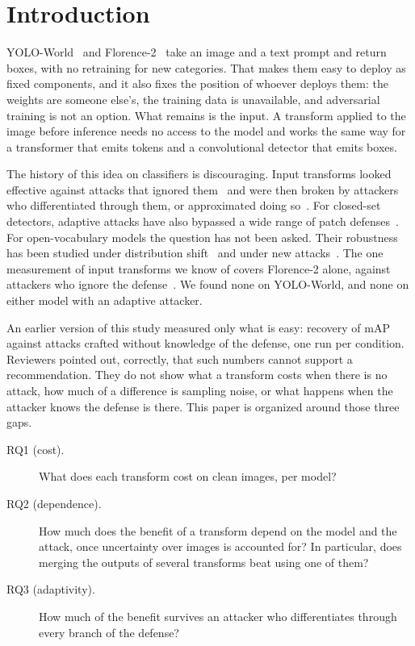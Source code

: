 \documentclass[11pt]{article}
\newcommand{\yw}{YOLO-World}
\newcommand{\fl}{Florence-2}
\begin{document}
\section{Introduction}

\yw{}~\cite{cheng2024yolo} and \fl{}~\cite{xiao2024florence} take an image
and a text prompt and return boxes, with no retraining for new categories.
That makes them easy to deploy as fixed components, and it also fixes the
position of whoever deploys them: the weights are someone else's, the training
data is unavailable, and adversarial training is not an option. What remains
is the input. A transform applied to the image before inference needs no
access to the model and works the same way for a transformer that emits tokens
and a convolutional detector that emits boxes.

The history of this idea on classifiers is discouraging. Input transforms
looked effective against attacks that ignored
them~\cite{guo2018countering,xu2018feature} and were then broken by attackers
who differentiated through them, or approximated doing
so~\cite{athalye2018obfuscated,tramer2020adaptive,croce2022evaluating}.
For closed-set detectors, adaptive attacks have also bypassed a wide range of
patch defenses~\cite{zheng2025revisiting}. For open-vocabulary models the
question has not been asked. Their robustness has been studied under
distribution shift~\cite{chhipa2024open} and under new
attacks~\cite{zhao2025one,liang2026unified}. The one measurement of input
transforms we know of covers \fl{} alone, against attackers who ignore the
defense~\cite{rajput2026evaluating}. We found none on \yw{}, and none on
either model with an adaptive attacker.

An earlier version of this study measured only what is easy: recovery of mAP
against attacks crafted without knowledge of the defense, one run per
condition. Reviewers pointed out, correctly, that such numbers cannot support
a recommendation. They do not show what a transform costs when there is no
attack, how much of a difference is sampling noise, or what happens when the
attacker knows the defense is there. This paper is organized around those
three gaps.

\begin{description}
\item[RQ1 (cost).] What does each transform cost on clean images, per model?
\item[RQ2 (dependence).] How much does the benefit of a transform depend on
the model and the attack, once uncertainty over images is accounted for? In
particular, does merging the outputs of several transforms beat using one of
them?
\item[RQ3 (adaptivity).] How much of the benefit survives an attacker who
differentiates through every branch of the defense?
\end{description}
\end{document}
